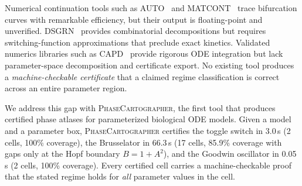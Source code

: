 \documentclass[11pt]{article}
\newcommand{\PC}{\textsc{PhaseCartographer}}
\begin{document}
Numerical continuation tools such as AUTO~\cite{doedel2007auto} and MATCONT~\cite{dhooge2008matcont} trace bifurcation curves with remarkable efficiency, but their output is floating-point and unverified.
DSGRN~\cite{cummins2016dsgrn} provides combinatorial decompositions but requires switching-function approximations that preclude exact kinetics.
Validated numerics libraries such as CAPD~\cite{kapela2021capd} provide rigorous ODE integration but lack parameter-space decomposition and certificate export.
No existing tool produces a \emph{machine-checkable certificate} that a claimed regime classification is correct across an entire parameter region.

We address this gap with \PC{}, the first tool that produces certified phase atlases for parameterized biological ODE models.
Given a model and a parameter box, \PC{} certifies the toggle switch in 3.0\,s (2 cells, 100\% coverage), the Brusselator in 66.3\,s (17 cells, 85.9\% coverage with gaps only at the Hopf boundary $B = 1 + A^2$), and the Goodwin oscillator in 0.05\,s (2 cells, 100\% coverage).
Every certified cell carries a machine-checkable proof that the stated regime holds for \emph{all} parameter values in the cell.
\end{document}
